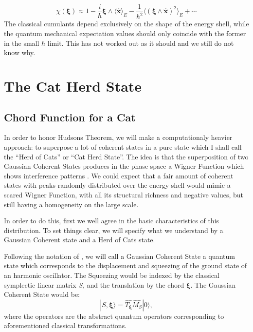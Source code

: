 \documentclass[a4paper,12pt]{article}
\newcommand{\ihb}{\frac{i}{\hbar}}
\newcommand{\xfase}{\mathbf{x}}
\newcommand{\xifase}{ {\boldsymbol{\xi}} }
\newcommand{\ket}[1]{|#1\rangle}
\newcommand{\Prom}[2]{\langle #1\rangle_{#2}}
\begin{document}
\begin{equation}
\chi(\xifase)\approx 
1-\ihb \xifase \wedge \Prom{\hat{\xfase}}{E}
-\frac{1}{\hbar^2}
\Prom{(\xifase\wedge \hat{\xfase})^2}{E}+\cdots
\end{equation}
The classical cumulants depend exclusively on the shape of the energy
shell, while the quantum mechanical expectation values should only
coincide with the former in the small $\hbar$ limit.
This has not worked out as it should and we still do not know why.

\section{The Cat Herd State}

\subsection{Chord Function for a Cat}

In order to honor Hudsons Theorem, we will make a computationaly
heavier approach: to superpose a lot of coherent states
in a pure state which I shall call the ``Herd of Cats'' or
``Cat Herd State''. The idea is that the superposition of two
Gaussian Coherent States produces in the 
phase space a Wigner Function which shows interference
patterns \cite{Vallejos10}. We could expect that a 
fair amount of coherent states with peaks randomly distributed over
the energy shell would mimic a scared Wigner Function,
with all its structural richness and negative values,
but still having a homogeneity on the large scale.

In order to do this, first we well agree in the basic
characteristics of this distribution. To set things clear,
we will specify what we understand by a Gaussian Coherent
state and a Herd of Cats state.   

Following the notation of \cite{Vallejos10}, we will
call a Gaussian Coherent State a quantum state which
corresponds to the displacement and squeezing of 
the ground state of an harmonic oscillator. The
Squeezing would be indexed by the classical symplectic
linear matrix $S$, and the translation by the 
chord $\xifase$.  The Gaussian Coherent State would be:
\begin{equation}
\ket{S,\xifase}=\hat{T_\xifase}\hat{M_S}\ket{0},
\end{equation}
where the operators are the abstract quantum
operators corresponding to aforementioned classical transformations.
\end{document}
